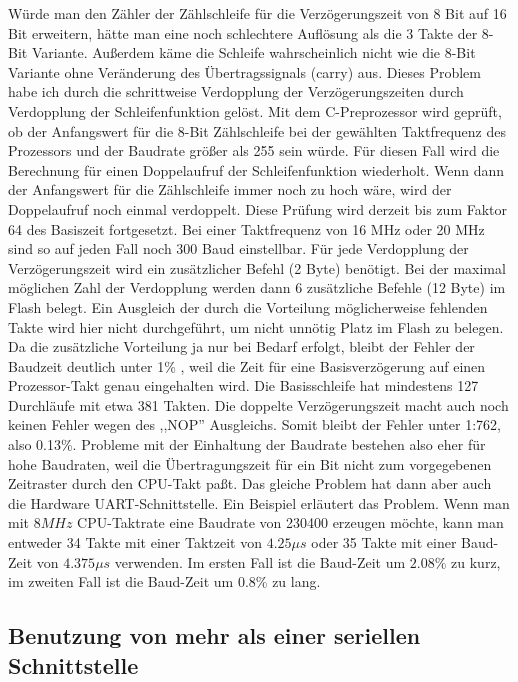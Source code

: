 Würde man den Zähler der Zählschleife für die Verzögerungszeit von 8 Bit auf 16 Bit erweitern,
hätte man eine noch schlechtere Auflösung als die 3 Takte der 8-Bit Variante.
Außerdem käme die Schleife wahrscheinlich nicht wie die 8-Bit Variante ohne Veränderung des Übertragssignals (carry) aus.
Dieses Problem habe ich durch die schrittweise Verdopplung der Verzögerungszeiten durch Verdopplung der
Schleifenfunktion gelöst. Mit dem C-Preprozessor wird geprüft, ob der Anfangswert für die 8-Bit Zählschleife
bei der gewählten Taktfrequenz des Prozessors und der Baudrate größer als 255 sein würde.
Für diesen Fall wird die Berechnung für einen Doppelaufruf der Schleifenfunktion wiederholt. 
Wenn dann der Anfangswert für die Zählschleife immer noch zu hoch wäre, wird der Doppelaufruf noch einmal
verdoppelt. Diese Prüfung wird derzeit bis zum Faktor 64 des Basiszeit fortgesetzt.
Bei einer Taktfrequenz von 16 MHz oder 20 MHz sind so auf jeden Fall noch 300 Baud einstellbar.
Für jede Verdopplung der Verzögerungszeit wird ein zusätzlicher Befehl (2 Byte) benötigt. 
Bei der maximal möglichen Zahl der Verdopplung werden dann 6 zusätzliche Befehle (12 Byte) im Flash belegt.
Ein Ausgleich der durch die Vorteilung möglicherweise fehlenden Takte wird hier nicht durchgeführt,
um nicht unnötig Platz im Flash zu belegen.
Da die zusätzliche Vorteilung ja nur bei Bedarf erfolgt, bleibt der Fehler der Baudzeit deutlich unter 1\% ,
weil die Zeit für eine Basisverzögerung auf einen Prozessor-Takt genau eingehalten wird.
Die Basisschleife hat mindestens 127 Durchläufe mit etwa 381 Takten. Die doppelte Verzögerungszeit
macht auch noch keinen Fehler wegen des ,,NOP'' Ausgleichs. Somit bleibt der Fehler unter 1:762,
also 0.13\%. Probleme mit der Einhaltung der Baudrate bestehen also eher für hohe Baudraten,
weil die Übertragungszeit für ein Bit nicht zum vorgegebenen Zeitraster durch den CPU-Takt paßt.
Das gleiche Problem hat dann aber auch die Hardware UART-Schnittstelle.
Ein Beispiel erläutert das Problem.
Wenn man mit \(8 MHz\) CPU-Taktrate eine Baudrate von 230400 erzeugen möchte, 
kann man entweder 34 Takte mit einer Taktzeit von \(4.25\mu s\) oder 35 Takte
mit einer Baud-Zeit von \(4.375\mu s\) verwenden. Im ersten Fall ist die Baud-Zeit
um \(2.08\%\) zu kurz, im zweiten Fall ist die Baud-Zeit um \(0.8\%\) zu lang.


\subsection{Benutzung von mehr als einer seriellen Schnittstelle}

